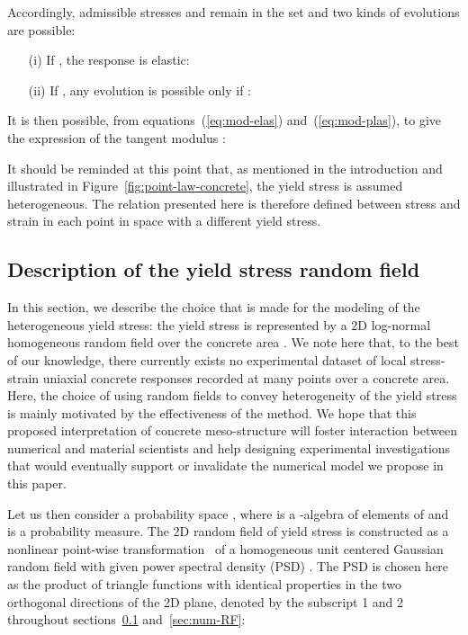 \documentclass[12p]{amsart}
\begin{document}
Accordingly, admissible stresses  and  remain in the set  and two kinds of evolutions are possible:
\begin{itemize}
 \item[(i)] If , the response is elastic:
 
 \item[(ii)] If , any evolution is possible only if :
 
\end{itemize}

It is then possible, from equations~(\ref{eq:mod-elas}) and~(\ref{eq:mod-plas}), to give the expression of the tangent modulus :


It should be reminded at this point that, as mentioned in the introduction and illustrated in Figure~\ref{fig:point-law-concrete}, the yield stress is assumed heterogeneous. The relation presented here is therefore defined between stress and strain in each point in space with a different yield stress.

\subsection{Description of the yield stress random field} \label{sec:yield-str-RF}

In this section, we describe the choice that is made for the modeling of the heterogeneous yield stress: the yield stress is represented by a 2D log-normal homogeneous random field over the concrete area . We note here that, to the best of our knowledge, there currently exists no experimental dataset of local stress-strain uniaxial concrete responses recorded at many points over a concrete area. Here, the choice of using random fields to convey heterogeneity of the yield stress is mainly motivated by the effectiveness of the method. We hope that this proposed interpretation of concrete meso-structure will foster interaction between numerical and material scientists and help designing experimental investigations that would eventually support or invalidate the numerical model we propose in this paper.

Let us then consider a probability space , where  is a -algebra of elements of  and  is a probability measure. The 2D random field of yield stress is constructed as a nonlinear point-wise transformation~\cite{Grigoriu1998}  of a homogeneous unit centered Gaussian random field  with given power spectral density (PSD) . The PSD is chosen here as the product of triangle functions with identical properties in the two orthogonal directions of the 2D plane, denoted by the subscript 1 and 2 throughout sections~\ref{sec:yield-str-RF} and~\ref{sec:num-RF}:
\end{document}
